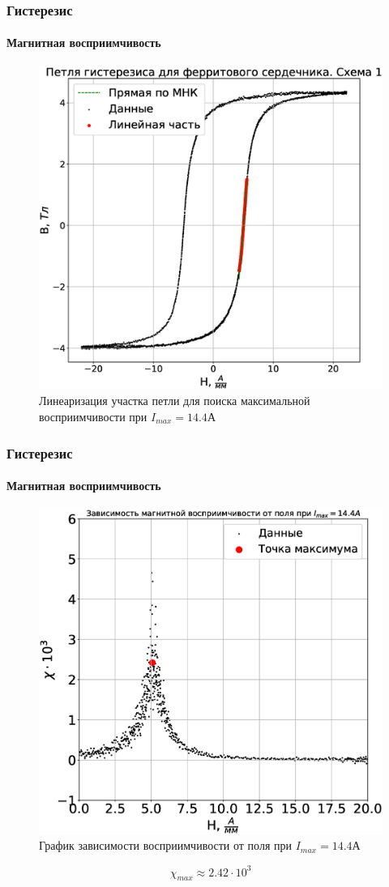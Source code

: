 \documentclass[8pt,pdf,hyperref={unicode}]{beamer}
\begin{document}
	\begin{frame}
		\frametitle{Гистерезис}
		\framesubtitle{Магнитная восприимчивость}
		\begin{center}
			\begin{figure}[h!]
				\centering
				\includegraphics[width=.5\linewidth]{Lab2_11.eps}
				\caption{Линеаризация участка петли для поиска максимальной восприимчивости при $I_{max} = 14.4$А}
				\label{fig:3}
			\end{figure}
		\end{center}
	\end{frame}
	
	\begin{frame}
		\frametitle{Гистерезис}
		\framesubtitle{Магнитная восприимчивость}
		\begin{center}
			\begin{figure}[h!]
				\centering
				\includegraphics[width=.45\linewidth]{Lab2_10.eps}
				\caption{График зависимости восприимчивости от поля при $I_{max} = 14.4$А}
				\label{fig:3}
			\end{figure}
			\begin{equation}
			\chi_{max} \approx 2.42 \cdot 10^3
			\end{equation}
		\end{center}
	\end{frame}
\end{document}
